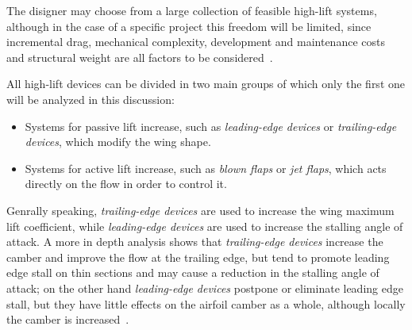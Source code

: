 \bigskip
\noindent
The disigner may choose from a large collection of feasible high-lift systems, although in the case of a specific project this freedom will be limited, since incremental drag, mechanical complexity, development and maintenance costs and structural weight are all factors to be considered~\cite{torenbeek1982synthesis}.

\bigskip
\noindent
All high-lift devices can be divided in two main groups of which only the first one will be analyzed in this discussion:
%
\begin{itemize}
\item Systems for passive lift increase, such as \emph{leading-edge devices} or \emph{trailing-edge devices}, which modify the wing shape.
\item Systems for active lift increase, such as \emph{blown flaps} or \emph{jet flaps}, which acts directly on the flow in order to control it.
\end{itemize}
%
\noindent
Genrally speaking, \emph{trailing-edge devices} are used to increase the wing maximum lift coefficient, while \emph{leading-edge devices} are used to increase the stalling angle of attack. 
%
A more in depth analysis shows that \emph{trailing-edge devices} increase the camber and improve the flow at the trailing edge, but tend to promote leading edge stall on thin sections and may cause a reduction in the stalling angle of attack; on the other hand \emph{leading-edge devices} postpone or eliminate leading edge stall, but  they have little effects on the airfoil camber as a whole, although locally the camber is increased~\cite{torenbeek1982synthesis}.

